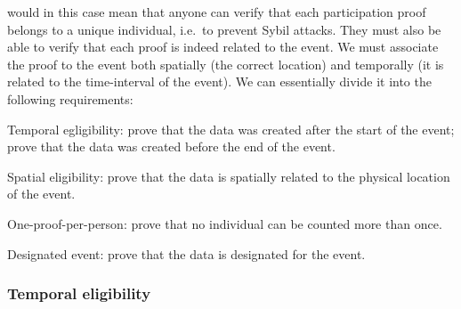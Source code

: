  would in this case mean that anyone can verify that 
each participation proof belongs to a unique individual, i.e.\ to prevent Sybil 
attacks.
They must also be able to verify that each proof is indeed related to the 
event.
We must associate the proof to the event both spatially (the correct location) 
and temporally (it is related to the time-interval of the event).
We can essentially divide it into the following requirements:
\begin{requirements}
  \item Temporal egligibility:%
    \label{CreatedAfterStart} prove that the data was created after the start of 
    the event;%
    \label{CreatedBeforeEnd} prove that the data was created before the end of 
    the event.
  \item Spatial eligibility:%
    \label{SpatiallyRelated} prove that the data is spatially related to the 
    physical location of the event.
  \item One-proof-per-person:%
    \label{CountOnce} prove that no individual can be counted more than once.
  \item Designated event:%
    \label{DesignatedEvent} prove that the data is designated for the event.
\end{requirements}


\subsubsection{Temporal eligibility}

